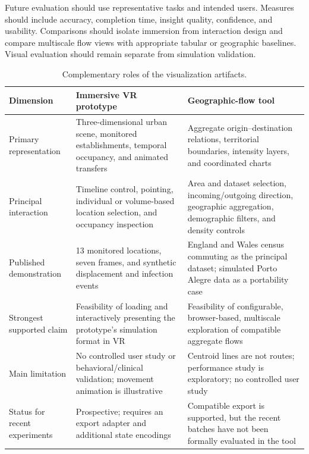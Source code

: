 Future evaluation should use representative tasks and intended users. Measures should include accuracy, completion time, insight quality, confidence, and usability. Comparisons should isolate immersion from interaction design and compare multiscale flow views with appropriate tabular or geographic baselines. Visual evaluation should remain separate from simulation validation.

\begin{table}[ht]
    \centering
    \footnotesize
    \caption{Complementary roles of the visualization artifacts.}
    \label{tbl:visualization_comparison}
    \begin{tabularx}{\linewidth}{@{}lXX@{}}
        \toprule
        \textbf{Dimension} & \textbf{Immersive VR prototype} & \textbf{Geographic-flow tool} \\ \midrule
        Primary representation & Three-dimensional urban scene, monitored establishments, temporal occupancy, and animated transfers & Aggregate origin--destination relations, territorial boundaries, intensity layers, and coordinated charts \\ \midrule
        Principal interaction & Timeline control, pointing, individual or volume-based location selection, and occupancy inspection & Area and dataset selection, incoming/outgoing direction, geographic aggregation, demographic filters, and density controls \\ \midrule
        Published demonstration & 13 monitored locations, seven frames, and synthetic displacement and infection events & England and Wales census commuting as the principal dataset; simulated Porto Alegre data as a portability case \\ \midrule
        Strongest supported claim & Feasibility of loading and interactively presenting the prototype's simulation format in VR & Feasibility of configurable, browser-based, multiscale exploration of compatible aggregate flows \\ \midrule
        Main limitation & No controlled user study or behavioral/clinical validation; movement animation is illustrative & Centroid lines are not routes; performance study is exploratory; no controlled user study \\ \midrule
        Status for recent experiments & Prospective; requires an export adapter and additional state encodings & Compatible export is supported, but the recent batches have not been formally evaluated in the tool \\ \bottomrule
    \end{tabularx}
\end{table}